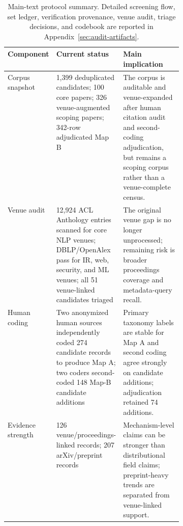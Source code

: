 \begin{table}[t]
\centering
\small
\begin{tabularx}{\linewidth}{p{0.16\linewidth}p{0.24\linewidth}X}
\toprule
\textbf{Component} & \textbf{Current status} & \textbf{Main implication} \\
\midrule
Corpus snapshot & 1,399 deduplicated candidates; 100 core papers; 326 venue-augmented scoping papers; 342-row adjudicated Map B & The corpus is auditable and venue-expanded after human citation audit and second-coding adjudication, but remains a scoping corpus rather than a venue-complete census. \\
Venue audit & 12,924 ACL Anthology entries scanned for core NLP venues; DBLP/OpenAlex pass for IR, web, security, and ML venues; all 51 venue-linked candidates triaged & The original venue gap is no longer unprocessed; remaining risk is broader proceedings coverage and metadata-query recall. \\
Human coding & Two anonymized human sources independently coded 274 candidate records to produce Map A; two coders second-coded 148 Map-B candidate additions & Primary taxonomy labels are stable for Map A and second coding agree strongly on candidate additions; adjudication retained 74 additions. \\
Evidence strength & 126 venue/proceedings-linked records; 207 arXiv/preprint records & Mechanism-level claims can be stronger than distributional field claims; preprint-heavy trends are separated from venue-linked support. \\
\bottomrule
\end{tabularx}
\caption{Main-text protocol summary. Detailed screening flow, set ledger, verification provenance, venue audit, triage decisions, and codebook are reported in Appendix~\ref{sec:audit-artifacts}.}
\label{tab:protocol-summary-main}
\end{table}
